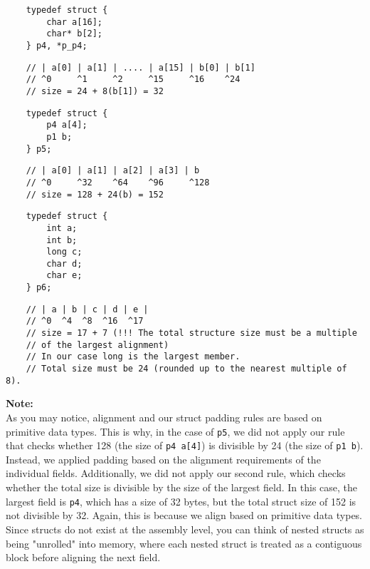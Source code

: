     \vspace{1em}
    
    \begin{verbatim}
    typedef struct {
        char a[16];
        char* b[2];
    } p4, *p_p4;
    \end{verbatim}
    
    \begin{verbatim}
    // | a[0] | a[1] | .... | a[15] | b[0] | b[1] 
    // ^0     ^1     ^2     ^15     ^16    ^24
    // size = 24 + 8(b[1]) = 32
    \end{verbatim}
    
    \vspace{1em}
    
    \begin{verbatim}
    typedef struct {
        p4 a[4];
        p1 b;
    } p5;
    \end{verbatim}
    
    \begin{verbatim}
    // | a[0] | a[1] | a[2] | a[3] | b
    // ^0     ^32    ^64    ^96     ^128 
    // size = 128 + 24(b) = 152
    \end{verbatim}
    
    \vspace{1em}
    
    \begin{verbatim}
    typedef struct {
        int a;
        int b;
        long c;
        char d;
        char e;
    } p6;
    \end{verbatim}
    
    \begin{verbatim}
    // | a | b | c | d | e |
    // ^0  ^4  ^8  ^16  ^17
    // size = 17 + 7 (!!! The total structure size must be a multiple
    // of the largest alignment)
    // In our case long is the largest member. 
    // Total size must be 24 (rounded up to the nearest multiple of 8).
    \end{verbatim}
\noindent\textbf{Note:} \\
%
As you may notice, alignment and our struct padding rules are based on 
primitive data types. This is why, in the case of \texttt{p5}, we did not 
apply our rule that checks whether 128 (the size of \texttt{p4 a[4]}) is 
divisible by 24 (the size of \texttt{p1 b}). Instead, we applied padding 
based on the alignment requirements of the individual fields.
%
Additionally, we did not apply our second rule, which checks whether the 
total size is divisible by the size of the largest field. In this case, 
the largest field is \texttt{p4}, which has a size of 32 bytes, but the 
total struct size of 152 is not divisible by 32. Again, this is because 
we align based on primitive data types.
%
Since structs do not exist at the assembly level, you can think of nested 
structs as being "unrolled" into memory, where each nested struct is treated 
as a contiguous block before aligning the next field.